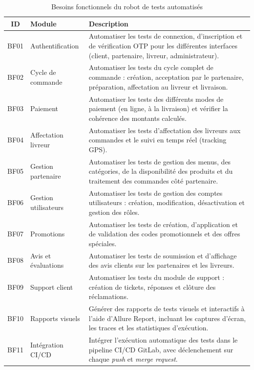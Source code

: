 \begin{table}[H]
\centering
\caption{Besoins fonctionnels du robot de tests automatisés}
\label{tab:besoins-fonctionnels}
\renewcommand{\arraystretch}{1.3}
\begin{tabularx}{\textwidth}{|c|l|X|}
\hline
\rowcolor{speedlineBlue!15}
\textbf{ID} & \textbf{Module} & \textbf{Description} \\
\hline
BF01 & Authentification & Automatiser les tests de connexion, d'inscription et de vérification OTP pour les différentes interfaces (client, partenaire, livreur, administrateur). \\
\hline
BF02 & Cycle de commande & Automatiser les tests du cycle complet de commande : création, acceptation par le partenaire, préparation, affectation au livreur et livraison. \\
\hline
BF03 & Paiement & Automatiser les tests des différents modes de paiement (en ligne, à la livraison) et vérifier la cohérence des montants calculés. \\
\hline
BF04 & Affectation livreur & Automatiser les tests d'affectation des livreurs aux commandes et le suivi en temps réel (tracking GPS). \\
\hline
BF05 & Gestion partenaire & Automatiser les tests de gestion des menus, des catégories, de la disponibilité des produits et du traitement des commandes côté partenaire. \\
\hline
BF06 & Gestion utilisateurs & Automatiser les tests de gestion des comptes utilisateurs : création, modification, désactivation et gestion des rôles. \\
\hline
BF07 & Promotions & Automatiser les tests de création, d'application et de validation des codes promotionnels et des offres spéciales. \\
\hline
BF08 & Avis et évaluations & Automatiser les tests de soumission et d'affichage des avis clients sur les partenaires et les livreurs. \\
\hline
BF09 & Support client & Automatiser les tests du module de support : création de tickets, réponses et clôture des réclamations. \\
\hline
BF10 & Rapports visuels & Générer des rapports de tests visuels et interactifs à l'aide d'Allure Report, incluant les captures d'écran, les traces et les statistiques d'exécution. \\
\hline
BF11 & Intégration CI/CD & Intégrer l'exécution automatique des tests dans le pipeline CI/CD GitLab, avec déclenchement sur chaque \textit{push} et \textit{merge request}. \\
\hline
\end{tabularx}
\end{table}

